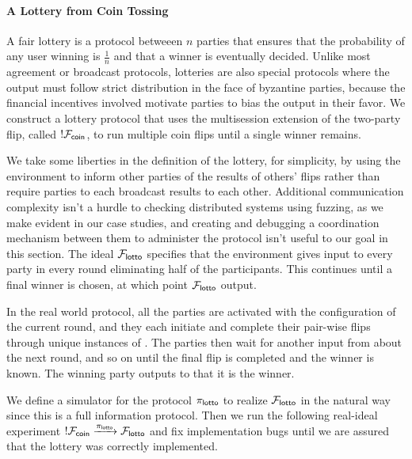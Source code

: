 
\paragraph{A Lottery from Coin Tossing}
A fair lottery is a protocol betweeen $n$ parties that ensures that the probability of any user winning is $\frac{1}{n}$ and that a winner is eventually decided.
Unlike most agreement or broadcast protocols, lotteries are also special protocols where the output must follow strict distribution in the face of byzantine parties, because the financial incentives involved motivate parties to bias the output in their favor.
We construct a lottery protocol that uses the multisession extension of the two-party flip, called $!\mathcal{F}_{{\mathsf {coin}}}$, to run multiple coin flips until a single winner remains. 

We take some liberties in the definition of the lottery, for simplicity, by using the environment to inform other parties of the results of others' flips rather than require parties to each broadcast results to each other. 
Additional communication complexity isn't a hurdle to checking distributed systems using fuzzing, as we make evident in our case studies, and creating and debugging a coordination mechanism between them to administer the protocol isn't useful to our goal in this section.
The ideal $\mathcal{F}_{{\mathsf {lotto}}}$ specifies that the environment gives input to every party in every round eliminating half of the participants.
This continues until a final winner is chosen, at which point $\mathcal{F}_{{\mathsf {lotto}}}$ output.

In the real world protocol, all the parties are activated with the configuration of the current round, and they each initiate and complete their pair-wise flips through unique instances of \Fcoin.
The parties then wait for another input from \Z about the next round, and so on until the final flip is completed and the winner is known.
The winning party outputs to \Z that it is the winner.

We define a simulator for the protocol $\pi_{{\mathsf {lotto}}}$ to realize $\mathcal{F}_{{\mathsf {lotto}}}$ in the natural way since this is a full information protocol.
Then we run the following real-ideal experiment 
$!\mathcal{F}_{{\mathsf {coin}}} \xrightarrow{\pi_{{\mathsf {lotto}}}} \mathcal{F}_{{\mathsf {lotto}}}$ and fix implementation bugs until we are assured that the lottery was correctly implemented.


